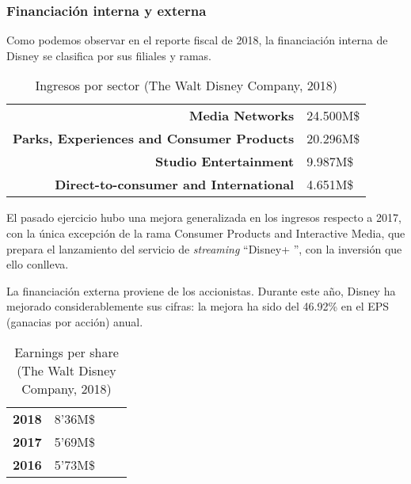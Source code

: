 \subsubsection{Financiación interna y externa}
Como podemos observar en el reporte fiscal de 2018, la financiación interna de Disney se clasifica por sus filiales y ramas. 

\begin{table}[]
\centering
\begin{tabular}{rl}
\textbf{Media Networks} & 24.500M\$ \\
 
\textbf{Parks, Experiences and Consumer Products} & 20.296M\$ \\
 
\textbf{Studio Entertainment} & 9.987M\$ \\

\textbf{Direct-to-consumer and International} & 4.651M\$ \\

\end{tabular}
\caption{\label{fig:frog} Ingresos por sector (The Walt Disney Company, 2018)}
\end{table}

El pasado ejercicio hubo una mejora generalizada en los ingresos respecto a 2017, con la única excepción de la rama Consumer Products and Interactive Media, que prepara el lanzamiento del servicio de \textit{streaming} \textquotedblleft Disney+ \textquotedblright, con la inversión que ello conlleva.

La financiación externa proviene de los accionistas. Durante este año, Disney ha mejorado considerablemente sus cifras: la mejora ha sido del 46.92\% en el EPS (ganacias por acción) anual.

\begin{table}[]
\centering
\begin{tabular}{rlrl}
\textbf{2018} & 8'36M\$ \\
 
\textbf{2017} & 5'69M\$ \\

\textbf{2016} & 5'73M\$ \\

\end{tabular}
\caption{\label{fig:frog} Earnings per share (The Walt Disney Company, 2018)}
\end{table}